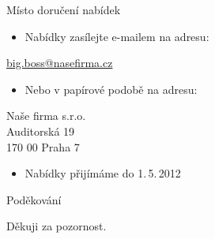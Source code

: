 \documentclass[10pt,hyperref={unicode=true}]{beamer}
\begin{document}
\begin{frame}{Místo doručení nabídek} 
		\begin{itemize}
			\item Nabídky zasílejte e-mailem na adresu:
		\end{itemize}
		\begin{center} \footnotesize
      \href{mailto:big.boss@nasefirma.cz}{big.boss@nasefirma.cz} \\
    \end{center}
		
		\begin{itemize}
			\item Nebo v papírové podobě na adresu:
		\end{itemize}
		\begin{center}  \footnotesize
      Naše firma s.r.o. \\
      Auditorská 19     \\
      170 00 \hspace{1mm} Praha 7 \\
    \end{center}
    
    \begin{itemize}
			\item Nabídky přijímáme do 1.\,5.\,2012
		\end{itemize}

\end{frame}

\begin{frame}{Poděkování}
	\begin{block}{Děkuji za pozornost.}
	\end{block}
\end{frame}
\end{document}
